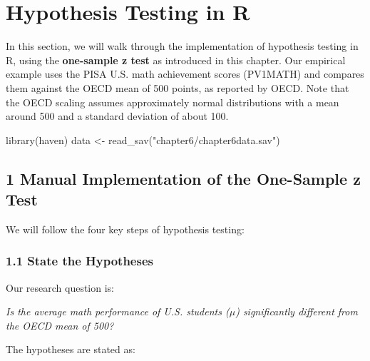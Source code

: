 \documentclass[
  letterpaper,
  DIV=11,
  numbers=noendperiod]{scrreprt}
\newenvironment{Shaded}{\begin{snugshade}}{\end{snugshade}}
\newcommand{\FunctionTok}[1]{\textcolor[rgb]{0.28,0.35,0.67}{#1}}
\newcommand{\NormalTok}[1]{\textcolor[rgb]{0.00,0.23,0.31}{#1}}
\newcommand{\OtherTok}[1]{\textcolor[rgb]{0.00,0.23,0.31}{#1}}
\newcommand{\StringTok}[1]{\textcolor[rgb]{0.13,0.47,0.30}{#1}}
\begin{document}

\chapter*{Hypothesis Testing in R}\label{hypothesis-testing-in-r}


In this section, we will walk through the implementation of hypothesis
testing in R, using the \textbf{one-sample z test} as introduced in this
chapter. Our empirical example uses the PISA U.S. math achievement
scores (PV1MATH) and compares them against the OECD mean of 500 points,
as reported by OECD. Note that the OECD scaling assumes approximately
normal distributions with a mean around 500 and a standard deviation of
about 100.

\begin{Shaded}
\begin{Highlighting}[]
\FunctionTok{library}\NormalTok{(haven) }
\NormalTok{data }\OtherTok{\textless{}{-}} \FunctionTok{read\_sav}\NormalTok{(}\StringTok{"chapter6/chapter6data.sav"}\NormalTok{) }
\end{Highlighting}
\end{Shaded}

\section*{1 Manual Implementation of the One-Sample z
Test}\label{manual-implementation-of-the-one-sample-z-test}


We will follow the four key steps of hypothesis testing:

\subsection*{1.1 State the Hypotheses}\label{state-the-hypotheses}

Our research question is:

\emph{Is the average math performance of U.S. students (\(\mu\))
significantly different from the OECD mean of 500? }

The hypotheses are stated as:
\end{document}
